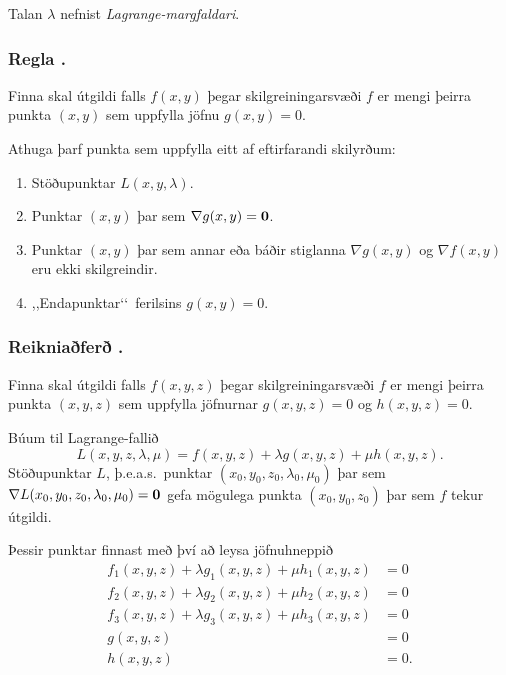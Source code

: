 Talan $\lambda$ nefnist \emph{Lagrange-margfaldari}.



\subsubsection{Regla \kaflanr.}
Finna skal útgildi falls $f(x,y)$ þegar skilgreiningarsvæði $f$ er mengi þeirra punkta $(x,y)$ sem uppfylla jöfnu $g(x,y)=0$.  

Athuga þarf punkta sem uppfylla eitt af eftirfarandi skilyrðum:

\begin {enumerate}
 \item Stöðupunktar $L(x,y,\lambda)$.
\item Punktar $(x,y)$ þar sem $\nabla g(x,y)=\mbox{${\bf 0}$}$.
\item  Punktar $(x,y)$ þar sem annar eða báðir stiglanna $\nabla
      g(x,y)$ og $\nabla f(x,y)$ eru ekki skilgreindir. 
\item ,,Endapunktar\lq\lq\ ferilsins $g(x,y)=0$.
 \end {enumerate}





\subsubsection{Reikniaðferð \kaflanr.}
Finna skal útgildi falls $f(x,y,z)$ þegar skilgreiningarsvæði $f$ er mengi þeirra punkta $(x,y,z)$ sem uppfylla jöfnurnar $g(x,y,z)=0$ og $h(x,y,z)=0$.  

Búum til Lagrange-fallið
$$L(x,y,z,\lambda,\mu)=f(x,y,z)+\lambda g(x,y,z)+\mu h(x,y,z).$$
Stöðupunktar $L$, þ.e.a.s.~punktar $(x_0,y_0,z_0,\lambda_0,\mu_0)$ þar sem $\nabla L(x_0,y_0,z_0,\lambda_0,\mu_0)=\mbox{${\bf 0}$}$ gefa mögulega punkta $(x_0,y_0,z_0)$ þar sem $f$ tekur útgildi.

Þessir punktar finnast með því að leysa jöfnuhneppið
\begin{align*}
f_1(x,y,z)+\lambda g_1(x,y,z)+\mu h_1(x,y,z)&=0\\
f_2(x,y,z)+\lambda g_2(x,y,z)+\mu h_2(x,y,z)&=0\\
f_3(x,y,z)+\lambda g_3(x,y,z)+\mu h_3(x,y,z)&=0\\
g(x,y,z)&=0\\
h(x,y,z)&=0.
\end{align*}








